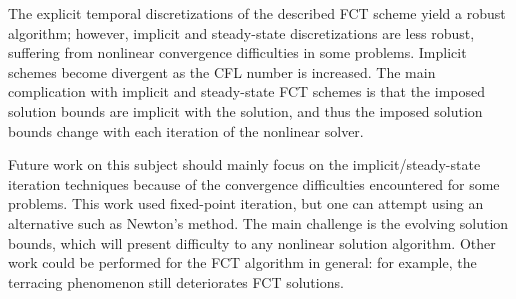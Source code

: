 The explicit temporal discretizations of the described FCT scheme yield a robust algorithm; however, implicit and steady-state discretizations
are less robust, suffering from nonlinear convergence difficulties
in some problems. Implicit schemes become divergent as the CFL
number is increased. The main complication with implicit and steady-state
FCT schemes is that the imposed solution bounds are implicit with the solution,
and thus the imposed solution bounds change with each iteration of the
nonlinear solver.

Future work on this subject should mainly focus on the implicit/steady-state
iteration techniques because of the convergence difficulties
encountered for some problems. This work used fixed-point iteration, but
one can attempt using an alternative such as Newton's method. The main
challenge is the evolving solution bounds, which will present difficulty
to any nonlinear solution algorithm. Other work could be performed for
the FCT algorithm in general: for example, the terracing phenomenon still
deteriorates FCT solutions. %
